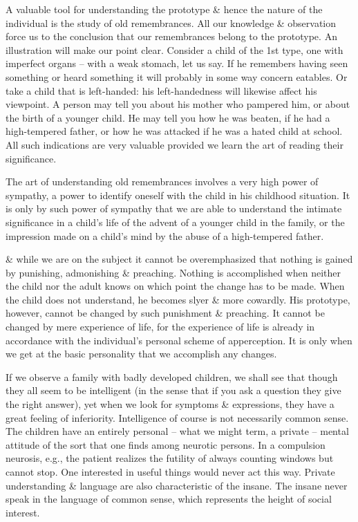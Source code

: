 \documentclass{article}
\begin{document}
A valuable tool for understanding the prototype \& hence the nature of the individual is the study of old remembrances. All our knowledge \& observation force us to the conclusion that our remembrances belong to the prototype. An illustration will make our point clear. Consider a child of the 1st type, one with imperfect organs -- with a weak stomach, let us say. If he remembers having seen something or heard something it will probably in some way concern eatables. Or take a child that is left-handed: his left-handedness will likewise affect his viewpoint. A person may tell you about his mother who pampered him, or about the birth of a younger child. He may tell you how he was beaten, if he had a high-tempered father, or how he was attacked if he was a hated child at school. All such indications are very valuable provided we learn the art of reading their significance.

The art of understanding old remembrances involves a very high power of sympathy, a power to identify oneself with the child in his childhood situation. It is only by such power of sympathy that we are able to understand the intimate significance in a child's life of the advent of a younger child in the family, or the impression made on a child's mind by the abuse of a high-tempered father.

\& while we are on the subject it cannot be overemphasized that nothing is gained by punishing, admonishing \& preaching. Nothing is accomplished when neither the child nor the adult knows on which point the change has to be made. When the child does not understand, he becomes slyer \& more cowardly. His prototype, however, cannot be changed by such punishment \& preaching. It cannot be changed by mere experience of life, for the experience of life is already in accordance with the individual's personal scheme of apperception. It is only when we get at the basic personality that we accomplish any changes.

If we observe a family with badly developed children, we shall see that though they all seem to be intelligent (in the sense that if you ask a question they give the right answer), yet when we look for symptoms \& expressions, they have a great feeling of inferiority. Intelligence of course is not necessarily common sense. The children have an entirely personal -- what we might term, a private -- mental attitude of the sort that one finds among neurotic persons. In a compulsion neurosis, e.g., the patient realizes the futility of always counting windows but cannot stop. One interested in useful things would never act this way. Private understanding \& language are also characteristic of the insane. The insane never speak in the language of common sense, which represents the height of social interest.
\end{document}
